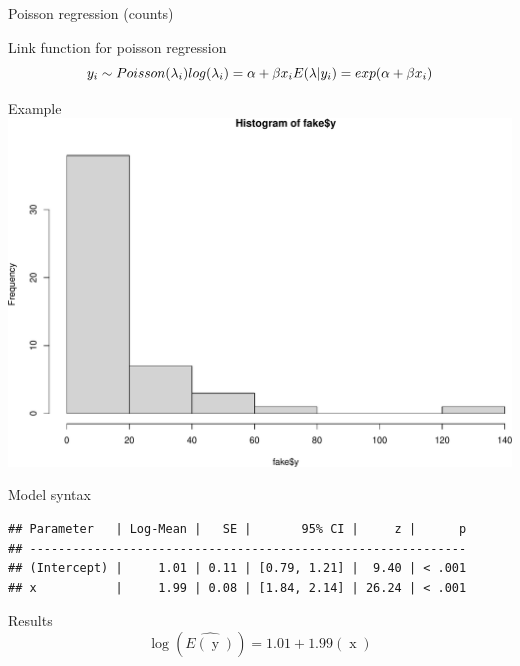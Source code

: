 \documentclass[
  ignorenonframetext,
]{beamer}
\begin{document}
\begin{frame}[fragile]{Poisson regression (counts)}
\protect\hypertarget{poisson-regression-counts}{}
\begin{block}{Link function for poisson regression}
\protect\hypertarget{link-function-for-poisson-regression}{}
\[
y_i \sim Poisson(\lambda_i)\\  
log(\lambda_i) = \alpha +\beta x_i\\
E(\lambda|y_i) = exp(\alpha +\beta x_i)
\]
\end{block}

\begin{block}{Example}
\protect\hypertarget{example}{}
\includegraphics{slides_files/figure-beamer/unnamed-chunk-32-1.pdf}
\end{block}

\begin{block}{Model syntax}
\protect\hypertarget{model-syntax-1}{}
\begin{verbatim}
## Parameter   | Log-Mean |   SE |       95% CI |     z |      p
## -------------------------------------------------------------
## (Intercept) |     1.01 | 0.11 | [0.79, 1.21] |  9.40 | < .001
## x           |     1.99 | 0.08 | [1.84, 2.14] | 26.24 | < .001
\end{verbatim}
\end{block}

\begin{block}{Results}
\protect\hypertarget{results-2}{}
\[
\log ({ \widehat{E( \operatorname{y} )} })  = 1.01 + 1.99(\operatorname{x})
\]
\end{block}


\end{frame}
\end{document}
